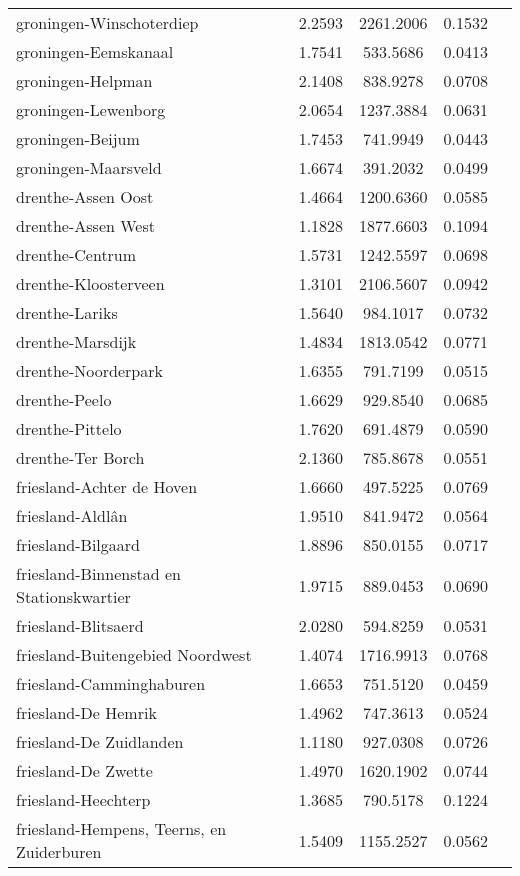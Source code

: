 \begin{longtable}{llccc}
groningen-Winschoterdiep & 2.2593 & 2261.2006 & 0.1532 \\
groningen-Eemskanaal & 1.7541 & 533.5686 & 0.0413 \\
groningen-Helpman & 2.1408 & 838.9278 & 0.0708 \\
groningen-Lewenborg & 2.0654 & 1237.3884 & 0.0631 \\
groningen-Beijum & 1.7453 & 741.9949 & 0.0443 \\
groningen-Maarsveld & 1.6674 & 391.2032 & 0.0499 \\
drenthe-Assen Oost & 1.4664 & 1200.6360 & 0.0585 \\
drenthe-Assen West & 1.1828 & 1877.6603 & 0.1094 \\
drenthe-Centrum & 1.5731 & 1242.5597 & 0.0698 \\
drenthe-Kloosterveen & 1.3101 & 2106.5607 & 0.0942 \\
drenthe-Lariks & 1.5640 & 984.1017 & 0.0732 \\
drenthe-Marsdijk & 1.4834 & 1813.0542 & 0.0771 \\
drenthe-Noorderpark & 1.6355 & 791.7199 & 0.0515 \\
drenthe-Peelo & 1.6629 & 929.8540 & 0.0685 \\
drenthe-Pittelo & 1.7620 & 691.4879 & 0.0590 \\
drenthe-Ter Borch & 2.1360 & 785.8678 & 0.0551 \\
friesland-Achter de Hoven & 1.6660 & 497.5225 & 0.0769 \\
friesland-Aldlân & 1.9510 & 841.9472 & 0.0564 \\
friesland-Bilgaard & 1.8896 & 850.0155 & 0.0717 \\
friesland-Binnenstad en Stationskwartier & 1.9715 & 889.0453 & 0.0690 \\
friesland-Blitsaerd & 2.0280 & 594.8259 & 0.0531 \\
friesland-Buitengebied Noordwest & 1.4074 & 1716.9913 & 0.0768 \\
friesland-Camminghaburen & 1.6653 & 751.5120 & 0.0459 \\
friesland-De Hemrik & 1.4962 & 747.3613 & 0.0524 \\
friesland-De Zuidlanden & 1.1180 & 927.0308 & 0.0726 \\
friesland-De Zwette & 1.4970 & 1620.1902 & 0.0744 \\
friesland-Heechterp & 1.3685 & 790.5178 & 0.1224 \\
friesland-Hempens, Teerns, en Zuiderburen & 1.5409 & 1155.2527 & 0.0562 \\

\end{longtable}
